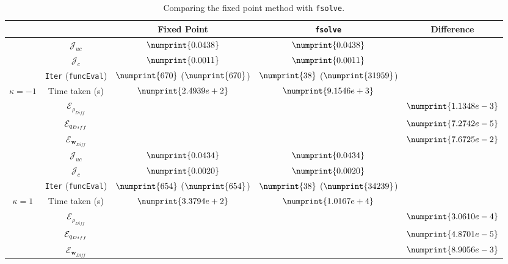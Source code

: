 \begin{table}
\begin{tabular}{ | c | c || c | c | c ||}
\hline
\multicolumn{2}{|c||}{} & Fixed Point & \texttt{fsolve} & Difference   \\
\hline
\hline
 & $\mathcal{J}_{uc}$ & $\numprint{0.0438}$ & $\numprint{0.0438}$ &   \\
 & $\mathcal{J}_{c}$ & $\numprint{0.0011}$ & $\numprint{0.0011}$ &   \\
 & \texttt{Iter} (\texttt{funcEval}) & $\numprint{670}$ ($\numprint{670}$)  & $\numprint{38}$ ($\numprint{31959}$)  &   \\
$\kappa =-1$ & Time taken (s) & $\numprint{2.4939e+2}$ & $\numprint{9.1546e+3}$ &   \\
 & $\mathcal{E}_{\rho_{Diff}}$ & & &$\numprint{1.1348e-3}$  \\
 & $\mathcal{E}_{q_{Diff}}$ & & &$\numprint{7.2742e-5}$  \\
 & $\mathcal{E}_{\mathbf{w}_{Diff}}$ & & & $\numprint{7.6725e-2}$  \\
\hline
 & $\mathcal{J}_{uc}$ & $\numprint{0.0434}$ & $\numprint{0.0434}$ &   \\
 & $\mathcal{J}_{c}$ & $\numprint{0.0020}$ & $\numprint{0.0020}$ &   \\
 & \texttt{Iter} (\texttt{funcEval}) & $\numprint{654}$ ($\numprint{654}$)  & $\numprint{38}$ ($\numprint{34239}$)  &   \\
$\kappa =1$ & Time taken (s) & $\numprint{3.3794e+2}$ & $\numprint{1.0167e+4}$ &   \\
 & $\mathcal{E}_{\rho_{Diff}}$ & & &$\numprint{3.0610e-4}$  \\
 & $\mathcal{E}_{q_{Diff}}$ & & &$\numprint{4.8701e-5}$  \\
 & $\mathcal{E}_{\mathbf{w}_{Diff}}$ & & & $\numprint{8.9056e-3}$  \\
\hline
\end{tabular}
\caption{Comparing the fixed point method with \texttt{fsolve}.}
\label{TabA3:Prob1}
\end{table}
